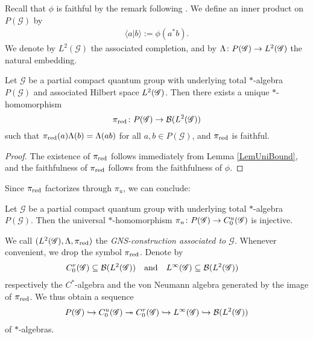 Recall that $\phi$ is faithful by the remark following \cite[Corollary 2.16]{DCT1}.  We define an inner product on $P(\mathscr{G})$ by
\begin{align*}
  \langle a|b\rangle :=\phi(a^{*}b).
\end{align*}
We denote by $L^{2}(\mathscr{G})$ the associated completion, and by
$\Lambda \colon P(\mathscr{G}) \to L^{2}(\mathscr{G})$ the natural embedding.

\begin{Prop} \label{prop:gns} Let $\mathscr{G}$ be a partial compact
  quantum group with underlying total $*$-algebra $P(\mathscr{G})$ and
  associated Hilbert space $L^{2}(\mathscr{G})$. Then there exists a unique
  $*$-homomorphism \[\pi_{\operatorname{\mathrm{red}}}\colon P(\mathscr{G}) \to {\cal B}(L^{2}(\mathscr{G}))\]
  such that $\pi_{\operatorname{\mathrm{red}}}(a)\Lambda(b)=\Lambda(ab)$ for all $a,b\in
  P(\mathscr{G})$, and $\pi_{\operatorname{\mathrm{red}}}$ is faithful.
\end{Prop}
\begin{proof} The existence of $\pi_{\operatorname{\mathrm{red}}}$ follows immediately from Lemma \ref{LemUniBound}, and the faithfulness of $\pi_{\operatorname{\mathrm{red}}}$ follows from the faithfulness of $\phi$. 
\end{proof}
Since $\pi_{\operatorname{\mathrm{red}}}$ factorizes through $\pi_{u}$, we can conclude:
\begin{Cor}
  Let $\mathscr{G}$ be a partial compact quantum group with underlying
  total $*$-algebra $P(\mathscr{G})$. Then the
universal $*$-homomorphism $\pi_{u} \colon P(\mathscr{G}) \to C^{u}_{0}(\mathscr{G})$ is injective.
\end{Cor}

We call $(L^{2}(\mathscr{G}),\Lambda,\pi_{\operatorname{\mathrm{red}}})$ the \emph{GNS-construction associated
  to $\mathscr{G}$}. Whenever convenient, we drop the symbol $\pi_{\operatorname{\mathrm{red}}}$. Denote by
\begin{align}
  C^{r}_{0}(\mathscr{G}) &\subseteq {\cal B}(L^{2}(\mathscr{G})) &&\text{and} & L^{\infty}(\mathscr{G}) &\subseteq {\cal B}(L^{2}(\mathscr{G}))
\end{align}
respectively the $C^{*}$-algebra and the von Neumann algebra generated by the image
of $\pi_{\operatorname{\mathrm{red}}}$. We thus obtain a sequence
\begin{align*}
P(\mathscr{G}) \hookrightarrow C^{u}_{0}(\mathscr{G}) \twoheadrightarrow
  C^{r}_{0}(\mathscr{G})\hookrightarrow
L^{\infty}(\mathscr{G}) \hookrightarrow {\cal B}(L^{2}(\mathscr{G}))
\end{align*}
of $*$-algebras.

